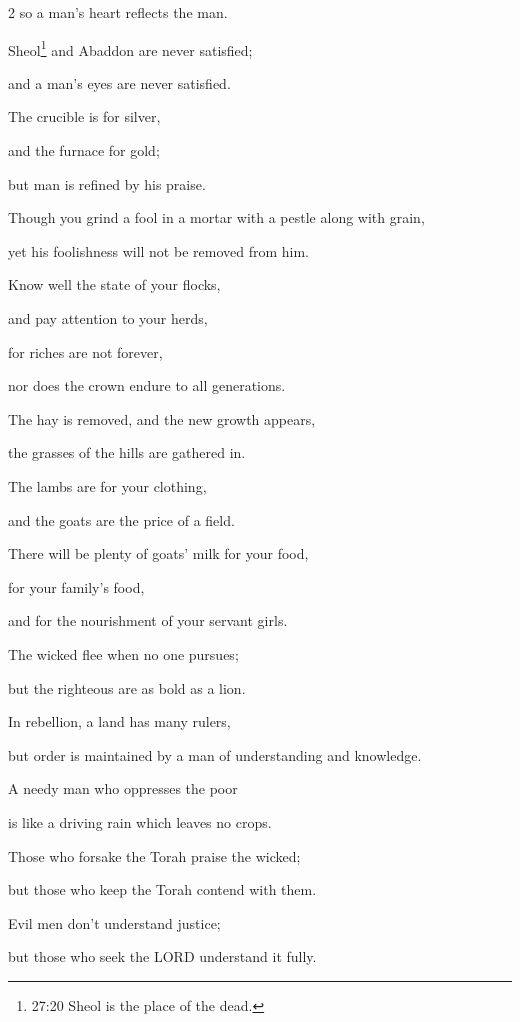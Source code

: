\begin{multicols}{2}
so a man’s heart reflects the man.


\myverse{}Sheol\footnote{27:20 Sheol is the place of the dead.} and Abaddon are never satisfied;

and a man’s eyes are never satisfied.


\myverse{}The crucible is for silver,

and the furnace for gold;

but man is refined by his praise.


\myverse{}Though you grind a fool in a mortar with a pestle along with
grain,

yet his foolishness will not be removed from him.


\vspace{\baselineskip} 
\myverse{}Know well the state of your flocks,

and pay attention to your herds,


\myverse{}for riches are not forever,

nor does the crown endure to all generations.


\myverse{}The hay is removed, and the new growth appears,

the grasses of the hills are gathered in.


\myverse{}The lambs are for your clothing,

and the goats are the price of a field.


\myverse{}There will be plenty of goats’ milk for your food,

for your family’s food,

and for the nourishment of your servant girls.


\mychapter{} \myverse*{}The wicked flee when no one pursues;

\quad\quad but the righteous are as bold as a lion.


\myverse{}In rebellion, a land has many rulers,

but order is maintained by a man of understanding and knowledge.


\myverse{}A needy man who oppresses the poor

is like a driving rain which leaves no crops.


\myverse{}Those who forsake the Torah praise the wicked;

but those who keep the Torah contend with them.


\myverse{}Evil men don’t understand justice;

but those who seek the LORD understand it fully.



\end{multicols}
